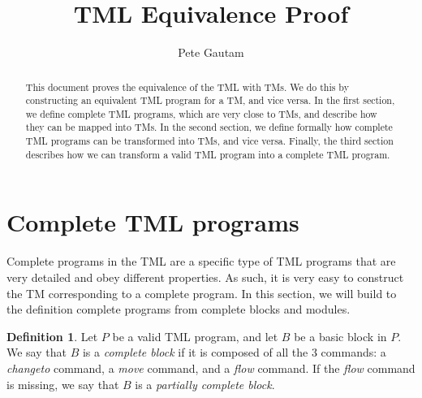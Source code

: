 \documentclass{article}
\title{TML Equivalence Proof}
\author{Pete Gautam}
\theoremstyle{definition}
\newtheorem{definition}[theorem]{Definition}
\begin{document}
    \maketitle

    \begin{abstract}
        This document proves the equivalence of the TML with TMs. We do this by constructing an equivalent TML program for a TM, and vice versa. In the first section, we define complete TML programs, which are very close to TMs, and describe how they can be mapped into TMs.  In the second section, we define formally how complete TML programs can be transformed into TMs, and vice versa. Finally, the third section describes how we can transform a valid TML program into a complete TML program.
    \end{abstract}

    \section{Complete TML programs}
    \noindent Complete programs in the TML are a specific type of TML programs that are very detailed and obey different properties. As such, it is very easy to construct the TM corresponding to a complete program. In this section, we will build to the definition complete programs from complete blocks and modules.
    \begin{definition}
        Let $P$ be a valid TML program, and let $B$ be a basic block in $P$. We say that $B$ is a \emph{complete block} if it is composed of all the 3 commands: a \textit{changeto} command, a \textit{move} command, and a \textit{flow} command. If the \textit{flow} command is missing, we say that $B$ is a \emph{partially complete block}.
    \end{definition}
\end{document}
